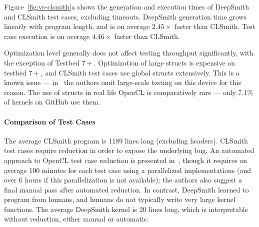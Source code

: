Figure~\ref{fig:vs-clsmith}a shows the generation and execution times of DeepSmith and CLSmith test cases, excluding timeouts. DeepSmith generation time grows linearly with program length, and is on average $2.45\times$ faster than CLSmith. Test case execution is on average $4.46\times$ faster than CLSmith.

Optimization level generally does not affect testing throughput significantly, with the exception of Testbed $7+$. Optimization of large structs is expensive on testbed $7+$, and CLSmith test cases use global structs extensively. This is a known issue --- in~\cite{Lidbury2015a} the authors omit large-scale testing on this device for this reason. The use of structs in real life OpenCL is comparatively rare --- only 7.1\% of kernels on GitHub use them.



\paragraph{Comparison of Test Cases} %
The average CLSmith program is 1189 lines long (excluding headers). CLSmith test cases require reduction in order to expose the underlying bug. An automated approach to OpenCL test case reduction is presented in~\cite{Pflanzer2016}, though it requires on average 100 minutes for each test case using a parallelized implementations (and over 6 hours if this parallelization is not available); the authors also suggest a final manual pass after automated reduction. In contrast, DeepSmith learned to program from humans, and humans do not typically write very large kernel functions. The average DeepSmith kernel is 20 lines long, which is interpretable without reduction, either manual or automatic. \cc{}





